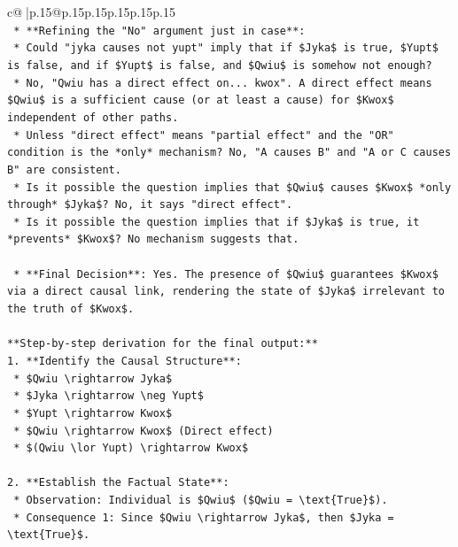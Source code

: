\documentclass{article}
\begin{document}
{\begin{supertabular}{c@{$\;$}|p{.15\linewidth}@{}p{.15\linewidth}p{.15\linewidth}p{.15\linewidth}p{.15\linewidth}p{.15\linewidth}}
{{{\\ 
\texttt{    *   **Refining the "No" argument just in case**:} \\
\texttt{        *   Could "jyka causes not yupt" imply that if \$Jyka\$ is true, \$Yupt\$ is false, and if \$Yupt\$ is false, and \$Qwiu\$ is somehow not enough?} \\
\texttt{        *   No, "Qwiu has a direct effect on... kwox". A direct effect means \$Qwiu\$ is a sufficient cause (or at least a cause) for \$Kwox\$ independent of other paths.} \\
\texttt{        *   Unless "direct effect" means "partial effect" and the "OR" condition is the *only* mechanism? No, "A causes B" and "A or C causes B" are consistent.} \\
\texttt{        *   Is it possible the question implies that \$Qwiu\$ causes \$Kwox\$ *only through* \$Jyka\$? No, it says "direct effect".} \\
\texttt{        *   Is it possible the question implies that if \$Jyka\$ is true, it *prevents* \$Kwox\$? No mechanism suggests that.} \\
\\ 
\texttt{    *   **Final Decision**: Yes. The presence of \$Qwiu\$ guarantees \$Kwox\$ via a direct causal link, rendering the state of \$Jyka\$ irrelevant to the truth of \$Kwox\$.} \\
\\ 
\texttt{**Step{-}by{-}step derivation for the final output:**} \\
\texttt{1.  **Identify the Causal Structure**:} \\
\texttt{    *   \$Qwiu \textbackslash{}rightarrow Jyka\$} \\
\texttt{    *   \$Jyka \textbackslash{}rightarrow \textbackslash{}neg Yupt\$} \\
\texttt{    *   \$Yupt \textbackslash{}rightarrow Kwox\$} \\
\texttt{    *   \$Qwiu \textbackslash{}rightarrow Kwox\$ (Direct effect)} \\
\texttt{    *   \$(Qwiu \textbackslash{}lor Yupt) \textbackslash{}rightarrow Kwox\$} \\
\\ 
\texttt{2.  **Establish the Factual State**:} \\
\texttt{    *   Observation: Individual is \$Qwiu\$ (\$Qwiu = \textbackslash{}text\{True\}\$).} \\
\texttt{    *   Consequence 1: Since \$Qwiu \textbackslash{}rightarrow Jyka\$, then \$Jyka = \textbackslash{}text\{True\}\$.} \\
}}}
\end{supertabular}}
\end{document}
